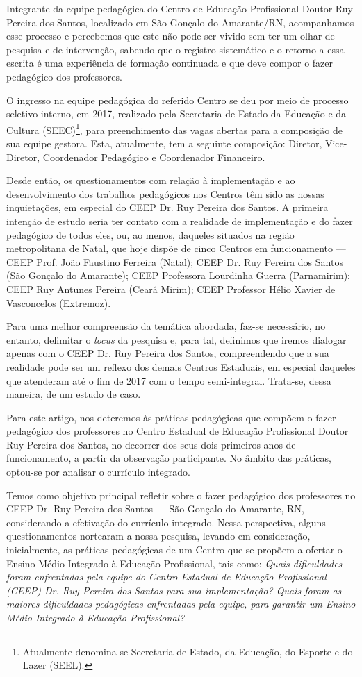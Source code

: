 \begin{refsection}
    Integrante da equipe pedagógica do Centro de Educação Profissional Doutor Ruy Pereira dos Santos, localizado em São Gonçalo do Amarante/RN, acompanhamos esse processo e percebemos que este não pode ser vivido sem ter um olhar de pesquisa e de intervenção, sabendo que o registro sistemático e o retorno a essa escrita é uma experiência de formação continuada e que deve compor o fazer pedagógico dos professores. 

    O ingresso na equipe pedagógica do referido Centro se deu por meio de processo seletivo interno, em 2017, realizado pela Secretaria de Estado da Educação e da Cultura (SEEC)\footnote{Atualmente denomina-se Secretaria de Estado, da Educação, do Esporte e do Lazer (SEEL).}, para preenchimento das vagas abertas para a composição de sua equipe gestora. Esta, atualmente, tem a seguinte composição: Diretor, Vice-Diretor, Coordenador Pedagógico e Coordenador Financeiro.  

    Desde então, os questionamentos com relação à implementação e ao desenvolvimento dos trabalhos pedagógicos nos Centros têm sido as nossas inquietações, em especial do CEEP Dr. Ruy Pereira dos Santos. A primeira intenção de estudo seria ter contato com a realidade de implementação e do fazer pedagógico de todos eles, ou, ao menos, daqueles situados na região metropolitana de Natal, que hoje dispõe de cinco Centros em funcionamento --- CEEP Prof. João Faustino Ferreira (Natal); CEEP Dr. Ruy Pereira dos Santos (São Gonçalo do Amarante); CEEP Professora Lourdinha Guerra (Parnamirim); CEEP Ruy Antunes Pereira (Ceará Mirim); CEEP Professor Hélio Xavier de Vasconcelos (Extremoz). 

    Para uma melhor compreensão da temática abordada, faz-se necessário, no entanto, delimitar o \textit{locus} da pesquisa e, para tal, definimos que iremos dialogar apenas com o CEEP Dr. Ruy Pereira dos Santos, compreendendo que a sua realidade pode ser um reflexo dos demais Centros Estaduais, em especial daqueles que atenderam até o fim de 2017 com o tempo semi-integral. Trata-se, dessa maneira, de um estudo de caso.  

    Para este artigo, nos deteremos às práticas pedagógicas que compõem o fazer pedagógico dos professores no Centro Estadual de Educação Profissional Doutor Ruy Pereira dos Santos, no decorrer dos seus dois primeiros anos de funcionamento, a partir da observação participante. No âmbito das práticas, optou-se por analisar o currículo integrado. 

    Temos como objetivo principal refletir sobre o fazer pedagógico dos professores no CEEP Dr. Ruy Pereira dos Santos --- São Gonçalo do Amarante, RN, considerando a efetivação do currículo integrado. Nessa perspectiva, alguns questionamentos nortearam a nossa pesquisa, levando em consideração, inicialmente, as práticas pedagógicas de um Centro que se propõem a ofertar o Ensino Médio Integrado à Educação Profissional, tais como: \textit{Quais dificuldades foram enfrentadas pela equipe do Centro Estadual de Educação Profissional (CEEP) Dr. Ruy Pereira dos Santos para sua implementação? Quais foram as maiores dificuldades pedagógicas enfrentadas pela equipe, para garantir um Ensino Médio Integrado à Educação Profissional?}


\end{refsection}
